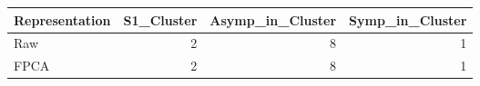 
\begin{tabular}{lrrr}
\toprule
Representation & S1\_Cluster & Asymp\_in\_Cluster & Symp\_in\_Cluster\\
\midrule
Raw & 2 & 8 & 1\\
FPCA & 2 & 8 & 1\\
\bottomrule
\end{tabular}
